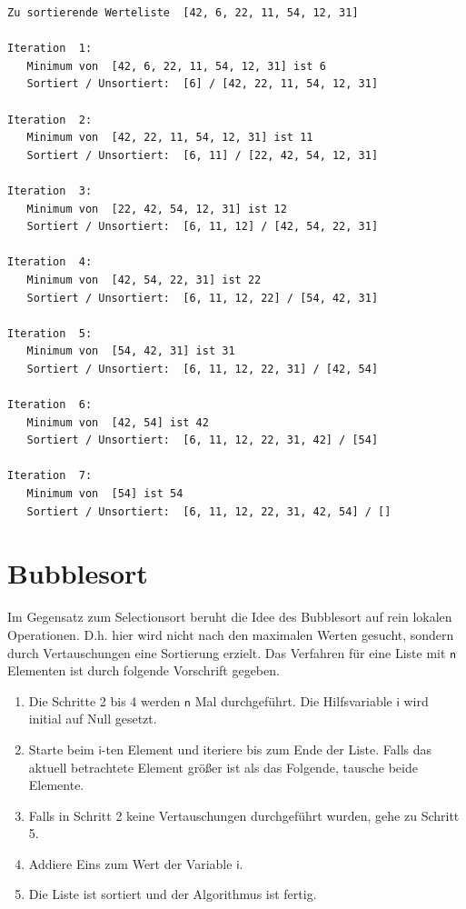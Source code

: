 \documentclass[
  letterpaper,
  DIV=11,
  numbers=noendperiod]{scrreprt}
\providecommand{\tightlist}{%
  \setlength{\itemsep}{0pt}\setlength{\parskip}{0pt}}\usepackage{longtable,booktabs,array}
\begin{document}
\begin{verbatim}
Zu sortierende Werteliste  [42, 6, 22, 11, 54, 12, 31]

Iteration  1: 
   Minimum von  [42, 6, 22, 11, 54, 12, 31] ist 6
   Sortiert / Unsortiert:  [6] / [42, 22, 11, 54, 12, 31]

Iteration  2: 
   Minimum von  [42, 22, 11, 54, 12, 31] ist 11
   Sortiert / Unsortiert:  [6, 11] / [22, 42, 54, 12, 31]

Iteration  3: 
   Minimum von  [22, 42, 54, 12, 31] ist 12
   Sortiert / Unsortiert:  [6, 11, 12] / [42, 54, 22, 31]

Iteration  4: 
   Minimum von  [42, 54, 22, 31] ist 22
   Sortiert / Unsortiert:  [6, 11, 12, 22] / [54, 42, 31]

Iteration  5: 
   Minimum von  [54, 42, 31] ist 31
   Sortiert / Unsortiert:  [6, 11, 12, 22, 31] / [42, 54]

Iteration  6: 
   Minimum von  [42, 54] ist 42
   Sortiert / Unsortiert:  [6, 11, 12, 22, 31, 42] / [54]

Iteration  7: 
   Minimum von  [54] ist 54
   Sortiert / Unsortiert:  [6, 11, 12, 22, 31, 42, 54] / []
\end{verbatim}

\section{Bubblesort}\label{bubblesort}

Im Gegensatz zum Selectionsort beruht die Idee des Bubblesort auf rein
lokalen Operationen. D.h. hier wird nicht nach den maximalen Werten
gesucht, sondern durch Vertauschungen eine Sortierung erzielt. Das
Verfahren für eine Liste mit \(\mathsf n\) Elementen ist durch folgende
Vorschrift gegeben.

\begin{enumerate}
\def\labelenumi{\arabic{enumi}.}
\tightlist
\item
  Die Schritte 2 bis 4 werden \(\mathsf n\) Mal durchgeführt. Die
  Hilfsvariable \(\mathsf i\) wird initial auf Null gesetzt.
\item
  Starte beim \(\mathsf i\)-ten Element und iteriere bis zum Ende der
  Liste. Falls das aktuell betrachtete Element größer ist als das
  Folgende, tausche beide Elemente.
\item
  Falls in Schritt 2 keine Vertauschungen durchgeführt wurden, gehe zu
  Schritt 5.
\item
  Addiere Eins zum Wert der Variable \(\mathsf i\).
\item
  Die Liste ist sortiert und der Algorithmus ist fertig.
\end{enumerate}
\end{document}

